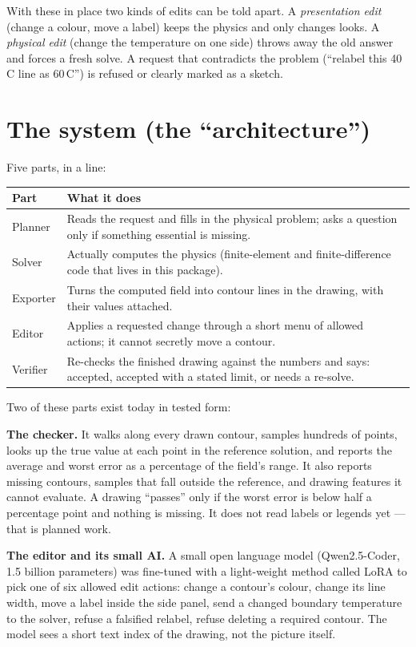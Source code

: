 \documentclass[11pt,a4paper]{article}
\newcommand{\degC}{\,\textdegree C}
\begin{document}
With these in place two kinds of edits can be told apart. A \emph{presentation edit} (change a colour, move a label) keeps the physics and only changes looks. A \emph{physical edit} (change the temperature on one side) throws away the old answer and forces a fresh solve. A request that contradicts the problem (``relabel this 40\degC{} line as 60\degC'') is refused or clearly marked as a sketch.

\section{The system (the ``architecture'')}

Five parts, in a line:

\begin{longtable}{L{3.0cm} L{12.0cm}}
\toprule
Part & What it does \\
\midrule
Planner & Reads the request and fills in the physical problem; asks a question only if something essential is missing. \\
Solver & Actually computes the physics (finite-element and finite-difference code that lives in this package). \\
Exporter & Turns the computed field into contour lines in the drawing, with their values attached. \\
Editor & Applies a requested change through a short menu of allowed actions; it cannot secretly move a contour. \\
Verifier & Re-checks the finished drawing against the numbers and says: accepted, accepted with a stated limit, or needs a re-solve. \\
\bottomrule
\end{longtable}

Two of these parts exist today in tested form:

\textbf{The checker.} It walks along every drawn contour, samples hundreds of points, looks up the true value at each point in the reference solution, and reports the average and worst error as a percentage of the field's range. It also reports missing contours, samples that fall outside the reference, and drawing features it cannot evaluate. A drawing ``passes'' only if the worst error is below half a percentage point and nothing is missing. It does not read labels or legends yet --- that is planned work.

\textbf{The editor and its small AI.} A small open language model (Qwen2.5-Coder, 1.5 billion parameters) was fine-tuned with a light-weight method called LoRA to pick one of six allowed edit actions: change a contour's colour, change its line width, move a label inside the side panel, send a changed boundary temperature to the solver, refuse a falsified relabel, refuse deleting a required contour. The model sees a short text index of the drawing, not the picture itself.
\end{document}
